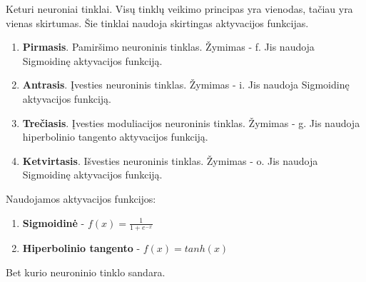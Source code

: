 Keturi neuroniai tinklai. Visų tinklų veikimo principas yra vienodas, tačiau yra vienas skirtumas. Šie tinklai naudoja skirtingas aktyvacijos funkcijas.
\begin{enumerate}
  \item \textbf{Pirmasis}. Pamiršimo neuroninis tinklas. Žymimas - f. Jis naudoja Sigmoidinę aktyvacijos funkciją.
  \item \textbf{Antrasis}. Įvesties neuroninis tinklas. Žymimas - i. Jis naudoja Sigmoidinę aktyvacijos funkciją.
  \item \textbf{Trečiasis}. Įvesties moduliacijos neuroninis tinklas. Žymimas - g. Jis naudoja hiperbolinio tangento aktyvacijos funkciją.
  \item \textbf{Ketvirtasis}. Išvesties neuroninis tinklas. Žymimas - o. Jis naudoja Sigmoidinę aktyvacijos funkciją.
\end{enumerate}

Naudojamos aktyvacijos funkcijos:
\begin{enumerate}
  \item \textbf{Sigmoidinė} - $f(x) = \frac{1}{1+e^{-x}}$
  \item \textbf{Hiperbolinio tangento} - $f(x) = tanh(x)$
\end{enumerate}

Bet kurio neuroninio tinklo sandara.
% 






